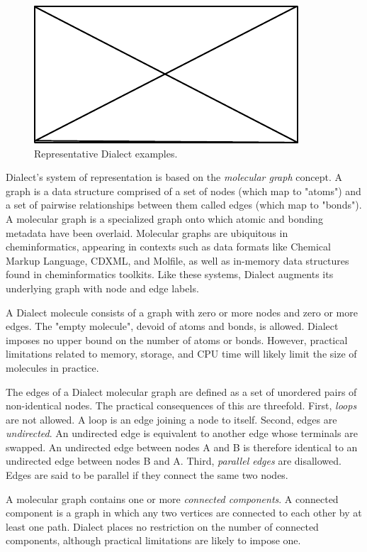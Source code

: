 \documentclass{article}
\begin{document}
\begin{figure}
\centering
\includegraphics{filler}
\caption{Representative Dialect examples.}
\label{fig:myfig}
\end{figure}

Dialect's system of representation is based on the \textit{molecular graph} concept.\cite{balaban:1985} A graph is a data structure comprised of a set of nodes (which map to "atoms") and a set of pairwise relationships between them called edges (which map to "bonds"). A molecular graph is a specialized graph onto which atomic and bonding metadata have been overlaid. Molecular graphs are ubiquitous in cheminformatics, appearing in contexts such as data formats like Chemical Markup Language\cite{murray-rust:2011}, CDXML\cite{cdxml}, and Molfile\cite{ctfileFormats}, as well as in-memory data structures found in cheminformatics toolkits. Like these systems, Dialect augments its underlying graph with node and edge labels.

A Dialect molecule consists of a graph with zero or more nodes and zero or more edges. The "empty molecule", devoid of atoms and bonds, is allowed. Dialect imposes no upper bound on the number of atoms or bonds. However, practical limitations related to memory, storage, and CPU time will likely limit the size of molecules in practice.

The edges of a Dialect molecular graph are defined as a set of unordered pairs of non-identical nodes. The practical consequences of this are threefold. First, \textit{loops} are not allowed. A loop is an edge joining a node to itself. Second, edges are \textit{undirected}. An undirected edge is equivalent to another edge whose terminals are swapped. An undirected edge between nodes A and B is therefore identical to an undirected edge between nodes B and A. Third, \textit{parallel edges} are disallowed. Edges are said to be parallel if they connect the same two nodes.

A molecular graph contains one or more \textit{connected components}. A connected component is a graph in which any two vertices are connected to each other by at least one path. Dialect places no restriction on the number of connected components, although practical limitations are likely to impose one.
\end{document}

